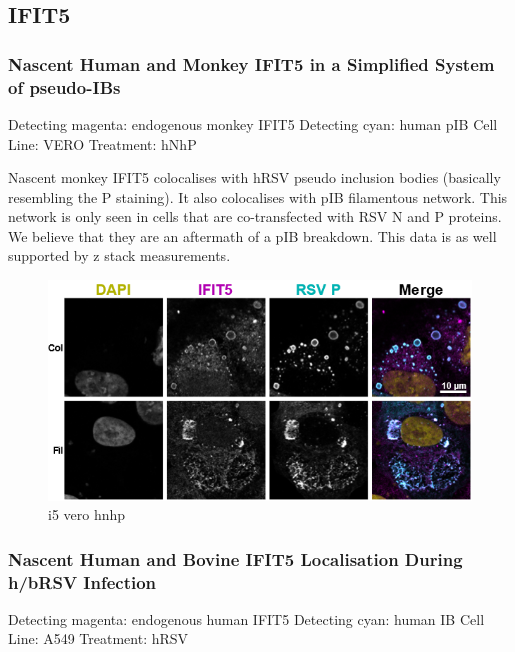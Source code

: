 \subsection{IFIT5} \label{IFIT5}
\subsubsection{Nascent Human and Monkey IFIT5 in a Simplified System of pseudo-IBs} \label{Nascent Human and Monkey IFIT5 in a Simplified System of pseudo-IBs}
Detecting magenta: endogenous monkey IFIT5 \newline
Detecting cyan: human pIB \newline
Cell Line: VERO \newline
Treatment: hNhP \newline

Nascent monkey IFIT5 colocalises with hRSV pseudo inclusion bodies (basically resembling the P staining). It also colocalises with pIB filamentous network. This network is only seen in cells that are co-transfected with RSV N and P proteins. We believe that they are an aftermath of a pIB breakdown. This data is as well supported by z stack measurements.

\begin{figure}
    \centering
    \includegraphics[width=1\linewidth]{08. Chapter 3/Figs/05. IFIT5/01. vero hnhp.png}
    \caption[i5 vero hnhp]{i5 vero hnhp}
    \label{i5 vero hnhp}
\end{figure}

\subsubsection{Nascent Human and Bovine IFIT5 Localisation During h/bRSV Infection} \label{Nascent Human and Bovine IFIT5 Localisation During h/bRSV Infection}
 \label{hIFIT5 Localisation During hRSV Infection}
Detecting magenta: endogenous human IFIT5 \newline
Detecting cyan: human IB \newline
Cell Line: A549 \newline
Treatment: hRSV \newline


